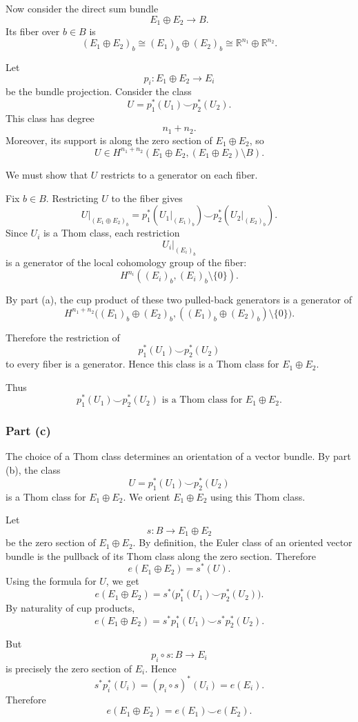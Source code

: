 \documentclass[12pt,a4paper]{article}
\theoremstyle{notespace}
\begin{document}
Now consider the direct sum bundle
\[
E_1\oplus E_2\to B.
\]
Its fiber over \(b\in B\) is
\[
(E_1\oplus E_2)_b
\cong
(E_1)_b\oplus (E_2)_b
\cong
\mathbb R^{n_1}\oplus \mathbb R^{n_2}.
\]

Let
\[
p_i:E_1\oplus E_2\to E_i
\]
be the bundle projection. Consider the class
\[
U
=
p_1^*(U_1)\smile p_2^*(U_2).
\]
This class has degree
\[
n_1+n_2.
\]
Moreover, its support is along the zero section of \(E_1\oplus E_2\), so
\[
U\in H^{n_1+n_2}(E_1\oplus E_2,(E_1\oplus E_2)\setminus B).
\]

We must show that \(U\) restricts to a generator on each fiber.

Fix \(b\in B\). Restricting \(U\) to the fiber gives
\[
U|_{(E_1\oplus E_2)_b}
=
p_1^*(U_1|_{(E_1)_b})
\smile
p_2^*(U_2|_{(E_2)_b}).
\]
Since \(U_i\) is a Thom class, each restriction
\[
U_i|_{(E_i)_b}
\]
is a generator of the local cohomology group of the fiber:
\[
H^{n_i}((E_i)_b,(E_i)_b\setminus\{0\}).
\]

By part (a), the cup product of these two pulled-back generators is a generator of
\[
H^{n_1+n_2}
\bigl(
(E_1)_b\oplus (E_2)_b,
((E_1)_b\oplus (E_2)_b)\setminus\{0\}
\bigr).
\]

Therefore the restriction of
\[
p_1^*(U_1)\smile p_2^*(U_2)
\]
to every fiber is a generator. Hence this class is a Thom class for
\(E_1\oplus E_2\).

Thus
\[
\boxed{
	p_1^*(U_1)\smile p_2^*(U_2)
	\text{ is a Thom class for }E_1\oplus E_2.
}
\]

\subsubsection*{Part (c)}

The choice of a Thom class determines an orientation of a vector bundle. By part
(b), the class
\[
U
=
p_1^*(U_1)\smile p_2^*(U_2)
\]
is a Thom class for \(E_1\oplus E_2\). We orient \(E_1\oplus E_2\) using this Thom
class.

Let
\[
s:B\to E_1\oplus E_2
\]
be the zero section of \(E_1\oplus E_2\). By definition, the Euler class of an
oriented vector bundle is the pullback of its Thom class along the zero section.
Therefore
\[
e(E_1\oplus E_2)
=
s^*(U).
\]
Using the formula for \(U\), we get
\[
e(E_1\oplus E_2)
=
s^*\bigl(p_1^*(U_1)\smile p_2^*(U_2)\bigr).
\]
By naturality of cup products,
\[
e(E_1\oplus E_2)
=
s^*p_1^*(U_1)\smile s^*p_2^*(U_2).
\]

But
\[
p_i\circ s:B\to E_i
\]
is precisely the zero section of \(E_i\). Hence
\[
s^*p_i^*(U_i)
=
(p_i\circ s)^*(U_i)
=
e(E_i).
\]
Therefore
\[
e(E_1\oplus E_2)
=
e(E_1)\smile e(E_2).
\]
\end{document}
